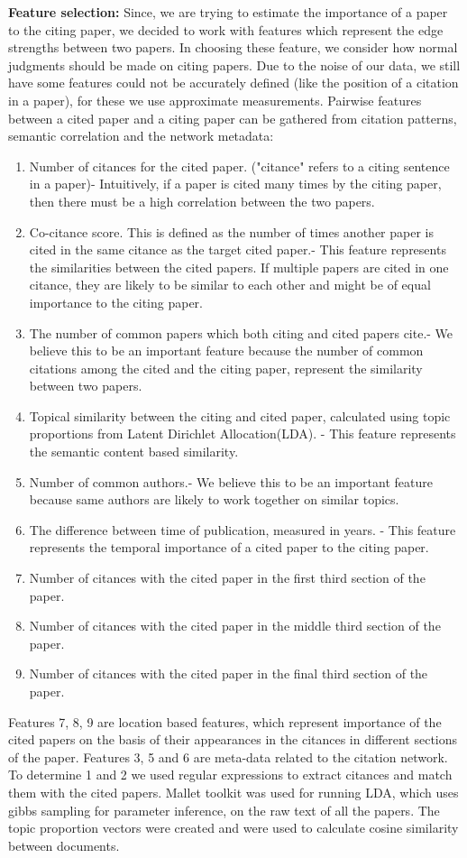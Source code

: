 \documentclass{article} %
\begin{document}
	\textbf{Feature selection:} Since, we are trying to estimate the importance of a paper to the citing paper, we decided to work with features which represent the edge strengths between two papers. In choosing these feature, we consider how normal judgments should be made on citing papers. Due to the noise of our data, we still have some features could not be accurately defined (like the position of a citation in a paper), for these we use approximate measurements. Pairwise features  between a cited paper and a citing paper can be gathered from citation patterns, semantic correlation and the network metadata:
\begin{enumerate}
  \item Number of citances for the cited paper. ("citance" refers to a citing sentence in a paper)- Intuitively, if a paper is cited many times by the citing paper, then there must be a high correlation between the two papers.
  \item Co-citance score. This is defined as the number of times another paper is cited in the same citance as the target cited paper.- This feature represents the similarities between the cited papers. If multiple papers are cited in one citance, they are likely to be similar to each other and might be of equal importance to the citing paper.
  \item The number of common papers which both citing and cited papers cite.- We believe this to be an important feature because the number of common citations among the cited and the citing paper, represent the similarity between two papers.
  \item Topical similarity between the citing and cited paper, calculated using topic proportions from Latent Dirichlet Allocation(LDA). - This feature represents the semantic content based similarity.
  \item Number of common authors.- We believe this to be an important feature because same authors are likely to work together on similar topics.
  \item The difference between time of publication, measured in years. - This feature represents the temporal importance of a cited paper to the citing paper.
  \item Number of citances with the cited paper in the first third section of the paper.
  \item Number of citances with the cited paper in the middle third section of the paper.
  \item Number of citances with the cited paper in the final third  section of the paper.
\end{enumerate}
Features 7, 8, 9 are location based features, which represent importance of the cited papers on the basis of their appearances in the citances in different sections of the paper. Features 3, 5 and 6 are meta-data related to the citation network. To determine 1 and 2 we used regular expressions to extract citances and match them with the cited papers. Mallet toolkit \cite{mallet} was used for running LDA, which uses gibbs sampling for parameter inference, on the raw text of all the papers. The topic proportion vectors were created and were used to calculate cosine similarity between documents.
\end{document}
